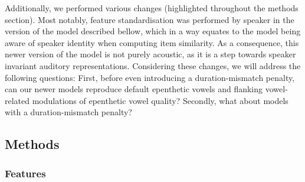 Additionally, we performed various changes (highlighted throughout the methods section). Most notably, feature standardisation was performed by speaker in the version of the model described bellow, which in a way equates to the model being aware of speaker identity when computing item similarity. As a consequence, this newer version of the model is not purely acoustic, as it is a step towards speaker invariant auditory representations. Considering these changes, we will address the following questions: First, before even introducing a duration-mismatch penalty, can our newer models reproduce default epenthetic vowels and flanking vowel-related modulations of epenthetic vowel quality? Secondly, what about models with a duration-mismatch penalty?    

\subsection{Methods}
\subsubsection{Features}



